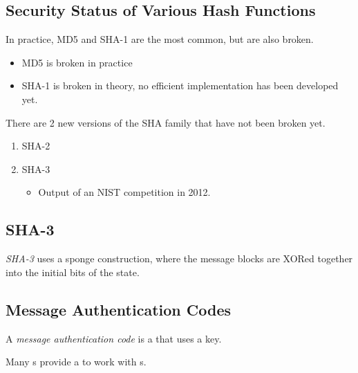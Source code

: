 \subsection{Security Status of Various Hash Functions}\label{subsec:Hash_Functions_Security_Status}
In practice, MD5 and SHA-1 are the most common, but are also broken.
\begin{itemize}[noitemsep]
\item MD5 is broken in practice
\item SHA-1 is broken in theory, no efficient implementation has been developed yet.
\end{itemize}

There are 2 new versions of the SHA family that have not been broken yet.
\begin{enumerate}[noitemsep]
\item SHA-2
\item SHA-3
  \begin{itemize}[noitemsep]
  \item Output of an NIST competition in 2012.
  \end{itemize}
\end{enumerate}

\subsection{SHA-3}\label{subsec:SHA_3}
\begin{definition}[SHA-3]\label{def:SHA_3}
  \emph{SHA-3} uses a sponge construction, where the message blocks are XORed together into the initial bits of the state.
\end{definition}

\subsection{Message Authentication Codes}\label{subsec:MACs}
\begin{definition}\label{def:MAC}
  A \emph{message authentication code} is a  that uses a key.

  \begin{remark}\label{rmk:MAC_Block_Cipher_Relation}
    Many s provide a  to work with s.
  \end{remark}
\end{definition}

